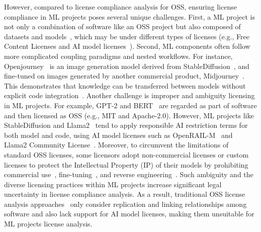 However, compared to license compliance analysis for OSS, ensuring license compliance in ML projects poses several unique challenges. 
First, a ML project is not only a combination of software like an OSS project but also composed of datasets and models~\cite{han2021pre}, which may be under different types of licenses (e.g., Free Content Licenses and AI model licenses~\cite{contractor2022behavioral}).
Second, ML components often follow more complicated coupling paradigms and nested workflows. For instance, Openjourney~\cite{openjourney2023prompthero} is an image generation model derived from StableDiffusion~\cite{rombach2022high}, and fine-tuned on images generated by another commercial product, Midjourney~\cite{midjourney2023terms}.
This demonstrates that knowledge can be transferred between models without explicit code integration~\cite{you2021workshop}.
Another challenge is improper and ambiguity licensing in ML projects.
For example, GPT-2 and BERT~\cite{devlin2019bert} are regarded as part of software and then licensed as OSS (e.g., MIT and Apache-2.0).
However, ML projects like StableDiffusion and Llama2~\cite{touvron2023llama} tend to apply responsible AI restriction terms for both model and code, using AI model licenses such as OpenRAIL-M~\cite{contractor2022behavioral} and Llama2 Community License~\cite{meta2023llama2}.
Moreover, to circumvent the limitations of standard OSS licenses, some licensors adopt non-commercial licenses or custom licenses to protect the Intellectual Property (IP) of their models by prohibiting commercial use~\cite{huang2022layoutlmv3}, fine-tuning~\cite{dreamlike2023}, and reverse engineering~\cite{goyal2022vision}.
Such ambiguity and the diverse licensing practices within ML projects  increase significant legal uncertainty in license compliance analysis.
As a result, traditional OSS license analysis approaches~\cite{ombredanne2020free, mathur2012empirical} only consider replication and linking relationships among software and also lack support for AI model licenses, making them unsuitable for ML projects license analysis.

